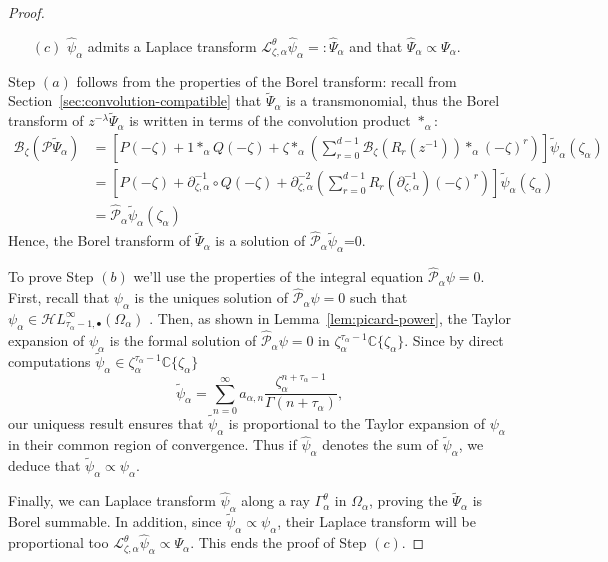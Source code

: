 \documentclass{article}
\newcommand{\singexp}[2]{\mathcal{H}L^\infty_{#1, #2}}
\newcommand{\singexpalg}[1]{\singexp{#1}{\bullet}}
\newcommand{\C}{\mathbb{C}}
\newcommand{\series}[1]{\tilde{#1}}
\newcommand{\fracderiv}[3]{\partial^{#1}_{#2, #3}}
\newcommand{\laplace}{\mathcal{L}}
\newcommand{\borel}{\mathcal{B}}
\theoremstyle{definition}
\theoremstyle{plain}
\begin{document}
{\begin{proof}
\begin{itemize}
\item[$(c)$] $\hat{\psi}_\alpha$ admits a Laplace transform $\laplace_{\zeta,\alpha}^{\theta}\hat{\psi}_\alpha=:\hat{\Psi}_\alpha$ and that $\hat{\Psi}_\alpha\propto\Psi_\alpha $. 
\end{itemize}
Step $(a)$ follows from the properties of the Borel transform: recall from Section~\ref{sec:convolution-compatible} that $\tilde{\Psi}_\alpha$ is a transmonomial, thus the Borel transform of $z^{-\lambda}\tilde{\Psi}_\alpha$ is written in terms of the convolution product $\ast_{\alpha}$:   
\begin{align*}
  \borel_{\zeta}\left(\mathcal{P}\series{\Psi}_\alpha\right)&= \left[P(-\zeta)+1\ast_{\alpha} Q(-\zeta)+\zeta \ast_{\alpha} \left(\sum_{r=0}^{d-1}\borel_\zeta(R_r(z^{-1}))\ast_{\alpha}(-\zeta)^r\right)\right]\series{\psi}_\alpha(\zeta_\alpha)\\
  &=\left[P(-\zeta)+\partial_{\zeta,\alpha}^{-1}\circ Q(-\zeta)+\fracderiv{-2}{\zeta}{\alpha} \left(\sum_{r=0}^{d-1}R_r(\fracderiv{-1}{\zeta}{\alpha} )(-\zeta)^r\right)\right]\series{\psi}_\alpha(\zeta_\alpha)\\
  &=\hat{\mathcal{P}}_\alpha\tilde{\psi}_\alpha(\zeta_\alpha)
\end{align*}
Hence, the Borel transform of $\series{\Psi}_\alpha$ is a solution of $\hat{\mathcal{P}}_\alpha\series{\psi}_\alpha$=0. 

To prove Step $(b)$ we'll use the properties of the integral equation $\hat{\mathcal{P}}_\alpha\psi=0$. First, recall that ${\psi}_\alpha$ is the uniques solution of $\hat{\mathcal{P}}_\alpha\psi=0$ such that $\psi_\alpha\in\singexpalg{\tau_\alpha-1}(\Omega_\alpha)$ \cite[Theorem~4]{reg-sing-volterra}. Then, as shown in Lemma~\ref{lem:picard-power}, the Taylor expansion of $\psi_\alpha$ is the formal solution of $\hat{\mathcal{P}}_\alpha\psi=0$ in $\zeta_\alpha^{\tau_\alpha-1}\C\lbrace\zeta_\alpha\rbrace$. Since by direct computations $\tilde{\psi}_\alpha\in\zeta_\alpha^{\tau_\alpha-1}\C\lbrace\zeta_\alpha\rbrace$
\[\tilde{\psi}_\alpha=\sum_{n=0}^\infty a_{\alpha,n}\frac{\zeta_\alpha^{n+\tau_\alpha-1}}{\Gamma(n+\tau_\alpha)},\]
our uniquess result ensures that $\tilde{\psi}_\alpha$ is proportional to the Taylor expansion of $\psi_\alpha$ in their common region of convergence. Thus if $\hat{\psi}_\alpha$ denotes the sum of $\tilde{\psi}_\alpha$, we deduce that $\tilde{\psi}_\alpha\propto\psi_\alpha$. 

Finally, we can Laplace transform $\hat{\psi}_\alpha$ along a ray $\Gamma_{\alpha}^\theta$ in $\Omega_\alpha$, proving the $\tilde{\Psi}_\alpha$ is Borel summable. In addition, since $\tilde{\psi}_\alpha\propto\psi_\alpha$, their Laplace transform will be proportional too $\laplace_{\zeta,\alpha}^\theta\hat{\psi}_\alpha\propto \Psi_\alpha$. This ends the proof of Step $(c)$. 
 




\end{proof}}
\end{document}
